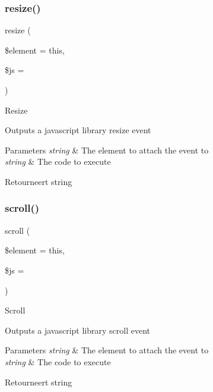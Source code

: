 \subsubsection{\texorpdfstring{resize()}{resize()}}
{\footnotesize\ttfamily resize (\begin{DoxyParamCaption}\item[{}]{\$element = {\ttfamily \textquotesingle{}this\textquotesingle{}},  }\item[{}]{\$js = {\ttfamily \textquotesingle{}\textquotesingle{}} }\end{DoxyParamCaption})}

Resize

Outputs a javascript library resize event


\begin{DoxyParams}{Parameters}
{\em string} & The element to attach the event to \\
\hline
{\em string} & The code to execute \\
\hline
\end{DoxyParams}
\begin{DoxyReturn}{Retourneert}
string 
\end{DoxyReturn}
\mbox{\label{class_c_i___javascript_acb749f777082c90c2b46eb1c367522dc}} 
\subsubsection{\texorpdfstring{scroll()}{scroll()}}
{\footnotesize\ttfamily scroll (\begin{DoxyParamCaption}\item[{}]{\$element = {\ttfamily \textquotesingle{}this\textquotesingle{}},  }\item[{}]{\$js = {\ttfamily \textquotesingle{}\textquotesingle{}} }\end{DoxyParamCaption})}

Scroll

Outputs a javascript library scroll event


\begin{DoxyParams}{Parameters}
{\em string} & The element to attach the event to \\
\hline
{\em string} & The code to execute \\
\hline
\end{DoxyParams}
\begin{DoxyReturn}{Retourneert}
string 
\end{DoxyReturn}
\mbox{\label{class_c_i___javascript_a37f187e47112ada2d8ffe4c840556178}} 
